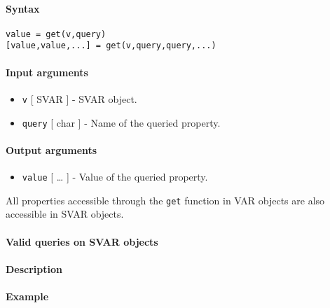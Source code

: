 


	\paragraph{Syntax}\label{syntax}

\begin{verbatim}
value = get(v,query)
[value,value,...] = get(v,query,query,...)
\end{verbatim}

\paragraph{Input arguments}\label{input-arguments}

\begin{itemize}
\item
  \texttt{v} {[} SVAR {]} - SVAR object.
\item
  \texttt{query} {[} char {]} - Name of the queried property.
\end{itemize}

\paragraph{Output arguments}\label{output-arguments}

\begin{itemize}
\itemsep1pt\parskip0pt
\item
  \texttt{value} {[} \ldots{} {]} - Value of the queried property.
\end{itemize}

All properties accessible through the \texttt{get} function in VAR
objects are also accessible in SVAR objects.

\paragraph{Valid queries on SVAR
objects}\label{valid-queries-on-svar-objects}

\paragraph{Description}\label{description}

\paragraph{Example}\label{example}



